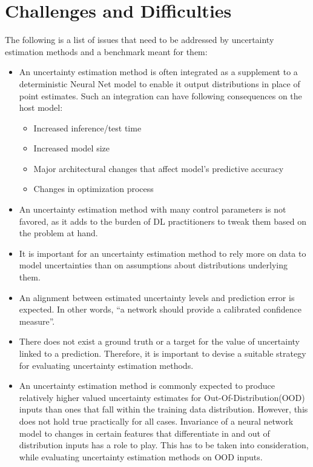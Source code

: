    \section{Challenges and Difficulties}
    The following is a list of issues that need to be addressed by uncertainty estimation methods and a benchmark meant for them:
    \begin{itemize}
    	\item An uncertainty estimation method is often integrated as a supplement to a deterministic Neural Net model to enable it output distributions in place of point estimates. Such an integration can have following consequences on the host model:
    	\begin{itemize}
		\item Increased inference/test time
		\item Increased model size
		\item Major architectural changes that affect model's predictive accuracy
		\item Changes in optimization process
    	\end{itemize}
    	\item An uncertainty estimation method with many control parameters is not favored, as it adds to the burden of DL practitioners to tweak them based on the problem at hand.
    	\item It is important for an uncertainty estimation method to rely more on data to model uncertainties than on assumptions about distributions underlying them.
    	\item An alignment between estimated uncertainty levels and prediction error is expected. In other words, \enquote{a network should provide a calibrated confidence measure}\cite{guo2017on}.
    	\item There does not exist a ground truth or a target for the value of uncertainty linked to a prediction. Therefore, it is important to devise a suitable strategy for evaluating uncertainty estimation methods.
    	\item An uncertainty estimation method is commonly expected to produce relatively higher valued uncertainty estimates for Out-Of-Distribution(OOD) inputs than ones that fall within the training data distribution. However, this does not hold true practically for all cases. Invariance of a neural network model to changes in certain features that differentiate in and out of distribution inputs has a role to play. This has to be taken into consideration, while evaluating uncertainty estimation methods on OOD inputs.
        \end{itemize}

